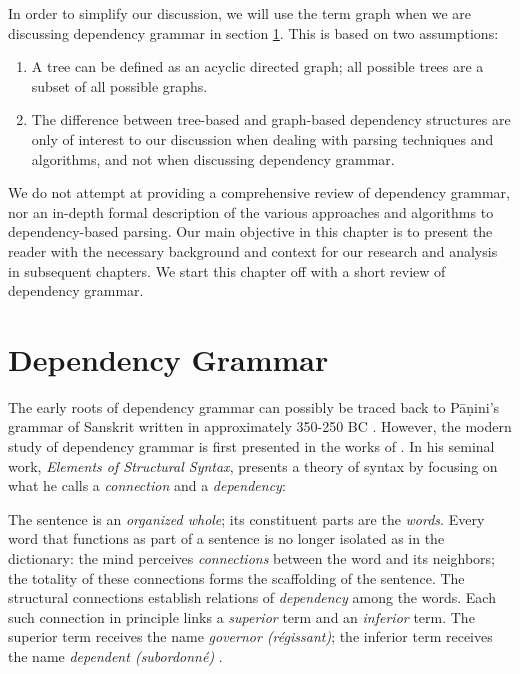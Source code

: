 In order to simplify our discussion, we will use the term graph when we are discussing dependency grammar in section \ref{grammar}. This is based on two assumptions:

\begin{enumerate}
\item A tree can be defined as an acyclic directed graph; all possible trees are a subset of all possible graphs.
\item The difference between tree-based and graph-based dependency structures are only of interest to our discussion when dealing with parsing techniques and algorithms, and not when discussing dependency grammar.
\end{enumerate}

We do not attempt at providing a comprehensive review of dependency grammar, nor an in-depth formal description of the various approaches and algorithms to dependency-based parsing. Our main objective in this chapter is to present the reader with the necessary background and context for our research and analysis in subsequent chapters. We start this chapter off with a short review of dependency grammar.

\section{Dependency Grammar}
\label{grammar}

The early roots of dependency grammar can possibly be traced back to P\={a}\d{n}ini's grammar of Sanskrit written in approximately 350-250 BC \cite{Kruijff:02}. However, the modern study of  dependency grammar is first presented in the works of \citeauthor{Tes:15}. In his seminal work, \textit{Elements of Structural Syntax}, \citeauthor{Tes:15} presents a theory of syntax by focusing on what he calls a \textit{connection} and a \textit{dependency}:

\begin{displayquote}
The sentence is an \textit{organized whole}; its constituent parts are the \textit{words}. Every word that functions as part of a sentence is no longer isolated as in the dictionary: the mind perceives \textit{connections} between the word and its neighbors; the totality of these connections forms the scaffolding of the sentence. The structural connections establish relations of \textit{dependency} among the words. Each such connection in principle links a \textit{superior} term and an \textit{inferior} term. The superior term receives the name \textit{governor (r\'{e}gissant)}; the inferior term receives the name \textit{dependent (subordonn\'{e})} \cite{Tes:15}.
\end{displayquote}

